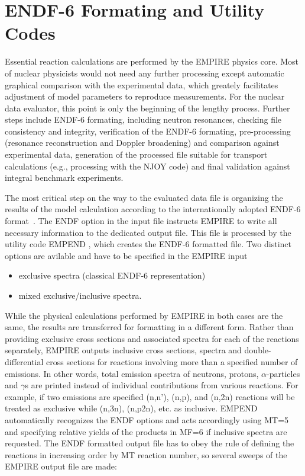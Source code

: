 \section{ENDF-6 Formating and Utility Codes}

Essential reaction calculations are performed by the EMPIRE physics core.
Most of nuclear physicists would not need any further processing except
automatic graphical comparison with the experimental data, which greately
facilitates adjustment of model parameters to reproduce measurements. For
the nuclear data evaluator, this point is only the beginning of the lengthy
process. Further steps include ENDF-6 formating, including neutron
resonances, checking file consistency and integrity, verification of the
ENDF-6 formating, pre-processing (resonance reconstruction and Doppler
broadening) and comparison against experimental data, generation of the
processed file suitable for transport calculations (e.g., processing with
the NJOY code) and final validation against integral benchmark experiments.

The most critical step on the way to the evaluated data file is organizing
the results of the model calculation according to the internationally
adopted ENDF-6 format~\cite{ENDF-102}. The ENDF option in the input file
instructs EMPIRE to write all necessary information to the dedicated output
file. This file is processed by the utility code EMPEND%
, which creates the ENDF-6 formatted file. Two distinct
options are avilable and have to be specified in the EMPIRE input

\begin{itemize}
\item exclusive spectra (classical ENDF-6 representation)

\item mixed exclusive/inclusive spectra.
\end{itemize}

While the physical calculations performed by EMPIRE in both cases are the
same, the results are transferred for formatting in a different form. Rather
than providing exclusive cross sections and associated spectra for each of
the reactions separately, EMPIRE outputs inclusive cross sections, spectra
and double-differential cross sections for reactions involving more than a
specified number of emissions. In other words, total emission spectra of
neutrons, protons, $\alpha$-particles and $\gamma$s are printed instead of
individual contributions from various reactions. For example, if two
emissions are specified (n,n'), (n,p), and (n,2n) reactions will be treated
as exclusive while (n,3n), (n,p2n), etc. as inclusive. EMPEND automatically
recognizes the ENDF options and acts accordingly using MT=5 and specifying
relative yields of the products in MF=6 if inclusive spectra are requested.
The ENDF formatted output file has to obey the rule of defining the
reactions in increasing order by MT reaction number, so several sweeps of
the EMPIRE output file are made:

